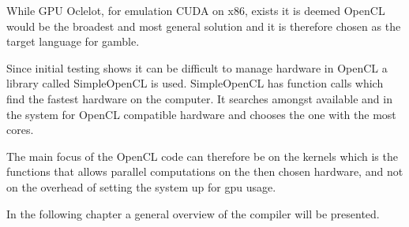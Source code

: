 While GPU Oclelot, for emulation CUDA on x86, exists it is deemed OpenCL would be the broadest and most general solution and it is therefore chosen as the target language for \gls{gamble}.

Since initial testing shows it can be difficult to manage hardware in OpenCL a library called SimpleOpenCL is used.
SimpleOpenCL has function calls which find the fastest hardware on the computer.
It searches amongst available  and  in the system for OpenCL compatible hardware and chooses the one with the most cores. \citep{simpleCL}

The main focus of the OpenCL code can therefore be on the kernels which is the functions that allows parallel computations on the then chosen hardware, and not on the overhead of setting the system up for \acrshort{gpu} usage.

In the following chapter a general overview of the compiler will be presented.

